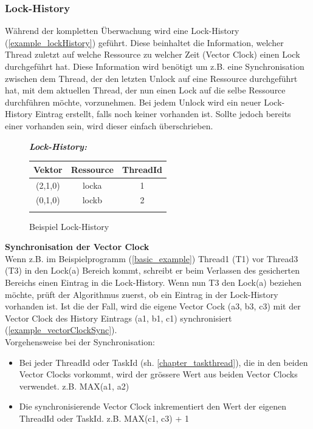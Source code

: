\documentclass[10pt,a4paper]{article}
\begin{document}
\subsubsection{Lock-History}\label{lock_history}
Während der kompletten Überwachung wird eine Lock-History (\autoref{example_lockHistory}) geführt. Diese beinhaltet die Information, welcher Thread zuletzt auf welche Ressource zu welcher Zeit (Vector Clock) einen Lock durchgeführt hat. Diese Information wird benötigt um z.B. eine Synchronisation zwischen dem Thread, der den letzten Unlock auf eine Ressource durchgeführt hat, mit dem aktuellen Thread, der nun einen Lock auf die selbe Ressource durchführen möchte, vorzunehmen. Bei jedem Unlock wird ein neuer Lock-History Eintrag erstellt, falls noch keiner vorhanden ist. Sollte jedoch bereits einer vorhanden sein, wird dieser einfach überschrieben.\\
\begin{figure}[H]
\begin{center}
\textbf{\textit{Lock-History:}}\\[0.5cm]
\begin{tabular}{ c c c }
  Vektor & Ressource & ThreadId \\\hline
  (2,1,0) & locka & 1 \\
  (0,1,0) & lockb & 2 \\\hline\\
\end{tabular}
\caption{Beispiel Lock-History}\label{example_lockHistory}
\end{center}
\end{figure}
\textbf{Synchronisation der Vector Clock}\\[0.3cm]
Wenn z.B. im Beispielprogramm (\autoref{basic_example}) Thread1 (T1) vor Thread3 (T3) in den Lock(a) Bereich kommt, schreibt er beim Verlassen des gesicherten Bereichs einen Eintrag in die Lock-History. Wenn nun T3 den Lock(a) beziehen möchte, prüft der Algorithmus zuerst, ob ein Eintrag in der Lock-History vorhanden ist. Ist die der Fall, wird die eigene Vector Cock (a3, b3, c3) mit der Vector Clock des History Eintrags (a1, b1, c1) synchronisiert (\autoref{example_vectorClockSync}).\\
\newpage
Vorgehensweise bei der Synchronisation:
\begin{itemize}
\item Bei jeder ThreadId oder TaskId (sh. \ref{chapter_taskthread}), die in den beiden Vector Clocks vorkommt, wird der grössere Wert aus beiden Vector Clocks verwendet. z.B. MAX(a1, a2)
\item Die synchronisierende Vector Clock inkrementiert den Wert der eigenen ThreadId oder TaskId. z.B. MAX(c1, c3) + 1
\end{itemize}
\end{document}
